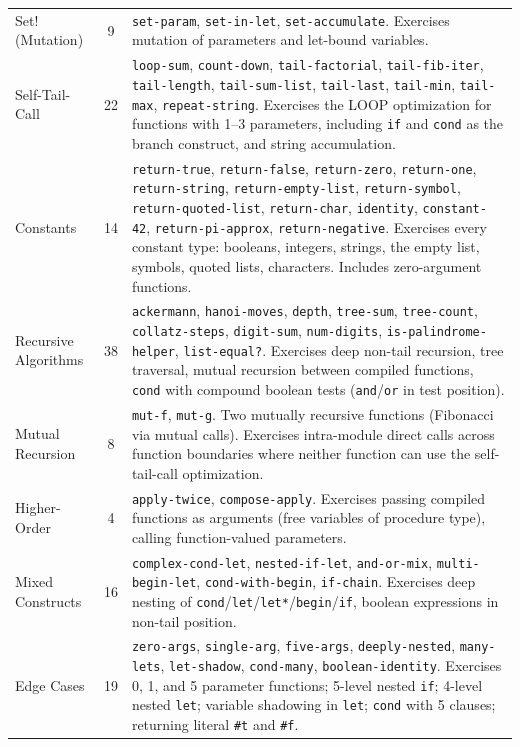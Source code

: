 \documentclass[12pt]{report}
\begin{document}
\begin{center}
\begin{longtable}{lcp{7.5cm}}
Set! (Mutation) & 9 &
  \texttt{set-param}, \texttt{set-in-let}, \texttt{set-accumulate}.
  Exercises mutation of parameters and let-bound variables. \\[0.5em]
Self-Tail-Call & 22 &
  \texttt{loop-sum}, \texttt{count-down}, \texttt{tail-factorial},
  \texttt{tail-fib-iter}, \texttt{tail-length},
  \texttt{tail-sum-list}, \texttt{tail-last}, \texttt{tail-min},
  \texttt{tail-max}, \texttt{repeat-string}.
  Exercises the LOOP optimization for functions with 1--3
  parameters, including \texttt{if} and \texttt{cond} as the
  branch construct, and string accumulation. \\[0.5em]
Constants & 14 &
  \texttt{return-true}, \texttt{return-false}, \texttt{return-zero},
  \texttt{return-one}, \texttt{return-string},
  \texttt{return-empty-list}, \texttt{return-symbol},
  \texttt{return-quoted-list}, \texttt{return-char},
  \texttt{identity}, \texttt{constant-42},
  \texttt{return-pi-approx}, \texttt{return-negative}.
  Exercises every constant type: booleans, integers,
  strings, the empty list, symbols, quoted lists, characters.
  Includes zero-argument functions. \\[0.5em]
Recursive Algorithms & 38 &
  \texttt{ackermann}, \texttt{hanoi-moves}, \texttt{depth},
  \texttt{tree-sum}, \texttt{tree-count}, \texttt{collatz-steps},
  \texttt{digit-sum}, \texttt{num-digits},
  \texttt{is-palindrome-helper}, \texttt{list-equal?}.
  Exercises deep non-tail recursion, tree traversal, mutual
  recursion between compiled functions, \texttt{cond} with
  compound boolean tests (\texttt{and}/\texttt{or} in test
  position). \\[0.5em]
Mutual Recursion & 8 &
  \texttt{mut-f}, \texttt{mut-g}.
  Two mutually recursive functions (Fibonacci via mutual calls).
  Exercises intra-module direct calls across function boundaries
  where neither function can use the self-tail-call optimization. \\[0.5em]
Higher-Order & 4 &
  \texttt{apply-twice}, \texttt{compose-apply}.
  Exercises passing compiled functions as arguments (free variables
  of procedure type), calling function-valued parameters. \\[0.5em]
Mixed Constructs & 16 &
  \texttt{complex-cond-let}, \texttt{nested-if-let},
  \texttt{and-or-mix}, \texttt{multi-begin-let},
  \texttt{cond-with-begin}, \texttt{if-chain}.
  Exercises deep nesting of \texttt{cond}/\texttt{let}/\texttt{let*}/\texttt{begin}/\texttt{if},
  boolean expressions in non-tail position. \\[0.5em]
Edge Cases & 19 &
  \texttt{zero-args}, \texttt{single-arg}, \texttt{five-args},
  \texttt{deeply-nested}, \texttt{many-lets}, \texttt{let-shadow},
  \texttt{cond-many}, \texttt{boolean-identity}.
  Exercises 0, 1, and 5 parameter functions; 5-level nested
  \texttt{if}; 4-level nested \texttt{let}; variable shadowing
  in \texttt{let}; \texttt{cond} with 5 clauses; returning literal
  \texttt{\#t} and \texttt{\#f}. \\[0.5em]
\bottomrule
\end{longtable}
\end{center}
\end{document}
